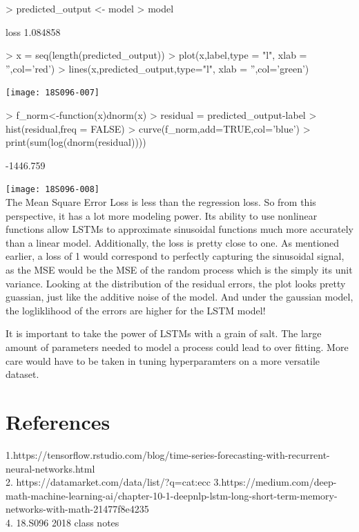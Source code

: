\documentclass{article}
\begin{document}
\begin{Schunk}
\begin{Sinput}
> predicted_output <- model %
> model %
\end{Sinput}
\begin{Soutput}
    loss 
1.084858 
\end{Soutput}
\begin{Sinput}
> x = seq(length(predicted_output))
> plot(x,label,type = "l", xlab = '',col='red')
> lines(x,predicted_output,type="l", xlab = '',col='green')
\end{Sinput}
\end{Schunk}
\texttt{[image: 18S096-007]}
\begin{Schunk}
\begin{Sinput}
> f_norm<-function(x){dnorm(x)}
> residual = predicted_output-label
> hist(residual,freq = FALSE)
> curve(f_norm,add=TRUE,col='blue')
> print(sum(log(dnorm(residual))))
\end{Sinput}
\begin{Soutput}
[1] -1446.759
\end{Soutput}
\end{Schunk}
\texttt{[image: 18S096-008]}
\\The Mean Square Error Loss is less than the regression loss. So from this perspective, it has a lot more modeling power. Its ability to use nonlinear functions allow LSTMs to approximate sinusoidal functions much more accurately than a linear model. Additionally, the loss is pretty close to one. As mentioned earlier, a loss of 1 would correspond to perfectly capturing the sinusoidal signal, as the MSE would be the MSE of the random process which is the simply its unit variance. Looking at the distribution of the residual errors, the plot looks pretty guassian, just like the additive noise of the model. And under the gaussian model, the logliklihood of the errors are higher for the LSTM model!

It is important to take the power of LSTMs with a grain of salt. The large amount of parameters needed to model a process could lead to over fitting. More care would have to be taken in tuning hyperparamters on a more versatile dataset.

\section{References}

1.https://tensorflow.rstudio.com/blog/time-series-forecasting-with-recurrent-neural-networks.html\\
2. https://datamarket.com/data/list/?q=cat:ecc%
3.https://medium.com/deep-math-machine-learning-ai/chapter-10-1-deepnlp-lstm-long-short-term-memory-networks-with-math-21477f8e4235\\
4. 18.S096 2018 class notes
\end{document}

